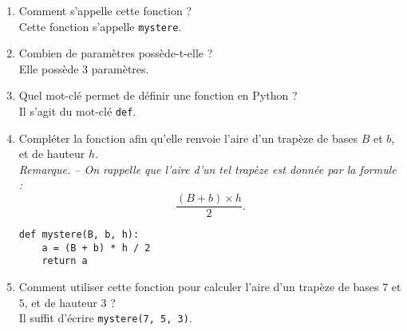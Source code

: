 \documentclass[a4paper,dvipsnames]{article}
\begin{document}
\begin{enumerate}
  \item Comment s'appelle cette fonction ?\\
    {\color{red}Cette fonction s'appelle \texttt{mystere}.}
  \item Combien de paramètres possède-t-elle ?\\
    {\color{red}Elle possède 3 paramètres.}
  \item Quel mot-clé permet de définir une fonction en Python ?\\
    {\color{red}Il s'agit du mot-clé \texttt{def}.}
  \item Compléter la fonction afin qu'elle renvoie l'aire d'un trapèze de bases $B$ et $b$, et de hauteur $h$.\\
    \textit{Remarque. -- On rappelle que l'aire d'un tel trapèze est donnée par la formule :
      \[\dfrac{(B + b)\times h}{2}.\]
  }
\begin{verbatim}
def mystere(B, b, h):
    a = (B + b) * h / 2
    return a
\end{verbatim}
\item Comment utiliser cette fonction pour calculer l'aire d'un trapèze de bases $7$ et $5$, et de hauteur $3$ ?\\
  {\color{red}Il suffit d'écrire \texttt{mystere(7, 5, 3)}.}
\end{enumerate}
\end{document}
